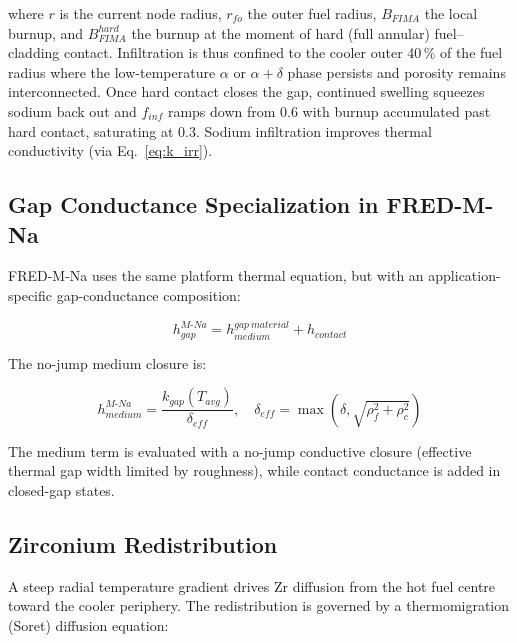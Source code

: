 \begin{refsection}
where $r$ is the current node radius, $r_{fo}$ the outer fuel radius, $B_{FIMA}$ the local burnup, and $B_{FIMA}^{hard}$ the burnup at the moment of hard (full annular) fuel--cladding contact.  Infiltration is thus confined to the cooler outer 40\,\% of the fuel radius where the low-temperature $\alpha$ or $\alpha{+}\delta$ phase persists and porosity remains interconnected.  Once hard contact closes the gap, continued swelling squeezes sodium back out and $f_{inf}$ ramps down from 0.6 with burnup accumulated past hard contact, saturating at 0.3.  Sodium infiltration improves thermal conductivity (via Eq.~\eqref{eq:k_irr}).

\subsection{Gap Conductance Specialization in FRED-M-Na}
\label{sec:gap_mna}

FRED-M-Na uses the same platform thermal equation, but with an application- specific gap-conductance composition:

\begin{equation}
  h_{gap}^{M\text{-}Na} = h_{medium}^{gap\ material} + h_{contact}
  \label{eq:hgap_mna_modular}
\end{equation}

The no-jump medium closure is:

\begin{equation}
  h_{medium}^{M\text{-}Na} = \frac{k_{gap}(T_{avg})}{\delta_{eff}},
  \quad
  \delta_{eff} = \max\!\left(\delta,\sqrt{\rho_f^2+\rho_c^2}\right)
  \label{eq:hgap_mna_medium}
\end{equation}

The medium term is evaluated with a no-jump conductive closure (effective thermal gap width limited by roughness), while contact conductance is added in closed-gap states.

\subsection{Zirconium Redistribution}
\label{sec:zrdist}

A steep radial temperature gradient drives Zr diffusion from the hot fuel centre toward the cooler periphery.  The redistribution is governed by a thermomigration (Soret) diffusion equation:


\end{refsection}
